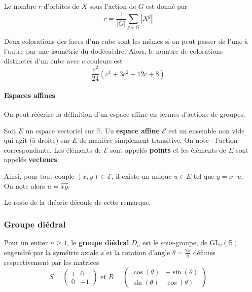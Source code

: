   \begin{theorem}
    Le nombre $r$ d'orbites de $X$ sous l'action de $G$ est donné par
    \[ r = \frac{1}{|G|} \sum_{g \in G} |X^g| \]
  \end{theorem}


  \begin{application}
    Deux colorations des faces d'un cube sont les mêmes si on peut passer de l'une à l'autre par une isométrie du dodécaèdre. Alors, le nombre de colorations distinctes d'un cube avec $c$ couleurs est
    \[ \frac{c^2}{24} (c^4 + 3c^2 + 12c + 8) \]
  \end{application}

  \paragraph{Espaces affines}


  On peut réécrire la définition d'un espace affine en termes d'actions de groupes.

  \begin{definition}
    Soit $E$ un espace vectoriel sur $\mathbb{R}$. Un \textbf{espace affine} $\mathcal{E}$ est un ensemble non vide qui agit (à droite) sur $E$ de manière simplement transitive. On note $\cdot$ l'action correspondante. Les éléments de $\mathcal{E}$ sont appelés \textbf{points} et les éléments de $E$ sont appelés \textbf{vecteurs}.
  \end{definition}

  \begin{remark}
    Ainsi, pour tout couple $(x,y) \in \mathcal{E}$, il existe un unique $u \in E$ tel que $y = x \cdot u$. On note alors $u = \overrightarrow{xy}$.
  \end{remark}

  Le reste de la théorie découle de cette remarque.

  \subsubsection{Groupe diédral}


  \begin{definition}
    Pour un entier $n \geq 1$, le \textbf{groupe diédral} $D_n$ est le sous-groupe, de $\mathrm{GL}_2(\mathbb{R})$ engendré par la symétrie axiale $s$ et la rotation d'angle $\theta = \frac{2\pi}{n}$ définies respectivement par les matrices
    \[
    S =
    \begin{pmatrix}
      1 & 0 \\
      0 & -1
    \end{pmatrix}
    \text{ et }
    R =
    \begin{pmatrix}
      \cos(\theta) & -\sin(\theta) \\
      \sin(\theta) & \cos(\theta)
    \end{pmatrix}
    \]
  \end{definition}


